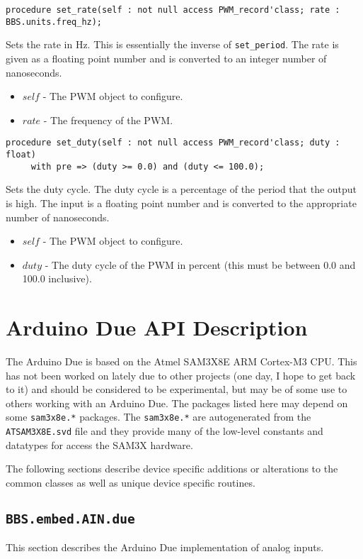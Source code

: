 \documentclass[10pt, openany]{book}
\newcommand{\indexfunc}[1]{\index[func]{#1}}
\newcommand{\package}[1]{\texttt{#1}}
\newcommand{\function}[1]{\texttt{#1}}
\newcommand{\filename}[1]{\texttt{#1}}
\begin{document}
\begin{lstlisting}
procedure set_rate(self : not null access PWM_record'class; rate : BBS.units.freq_hz);
\end{lstlisting}
\indexfunc{set\_rate}
Sets the rate in Hz.  This is essentially the inverse of \function{set\_period}.  The rate is given as a floating point number and is converted to an integer number of nanoseconds.
\begin{itemize}
  \item $self$ - The PWM object to configure.
  \item $rate$ - The frequency of the PWM.
\end{itemize}

\begin{lstlisting}
procedure set_duty(self : not null access PWM_record'class; duty : float)
     with pre => (duty >= 0.0) and (duty <= 100.0);
\end{lstlisting}
\indexfunc{set\_duty}
Sets the duty cycle.  The duty cycle is a percentage of the period that the output is high.  The input is a floating point number and is converted to the appropriate number of nanoseconds.
\begin{itemize}
  \item $self$ - The PWM object to configure.
  \item $duty$ - The duty cycle of the PWM in percent (this must be between 0.0 and 100.0 inclusive).
\end{itemize}

\chapter{Arduino Due API Description}
The Arduino Due is based on the Atmel SAM3X8E ARM Cortex-M3 CPU\cite{SAM3X}.  This has not been worked on lately due to other projects (one day, I hope to get back to it) and should be considered to be experimental, but may be of some use to others working with an Arduino Due.  The packages listed here may depend on some \package{sam3x8e.*} packages.  The \package{sam3x8e.*} are autogenerated from the \filename{ATSAM3X8E.svd} file and they provide many of the low-level constants and datatypes for access the SAM3X hardware.

The following sections describe device specific additions or alterations to the common classes as well as unique device specific routines.

\section{\package{BBS.embed.AIN.due}}
This section describes the Arduino Due implementation of analog inputs.
\end{document}
